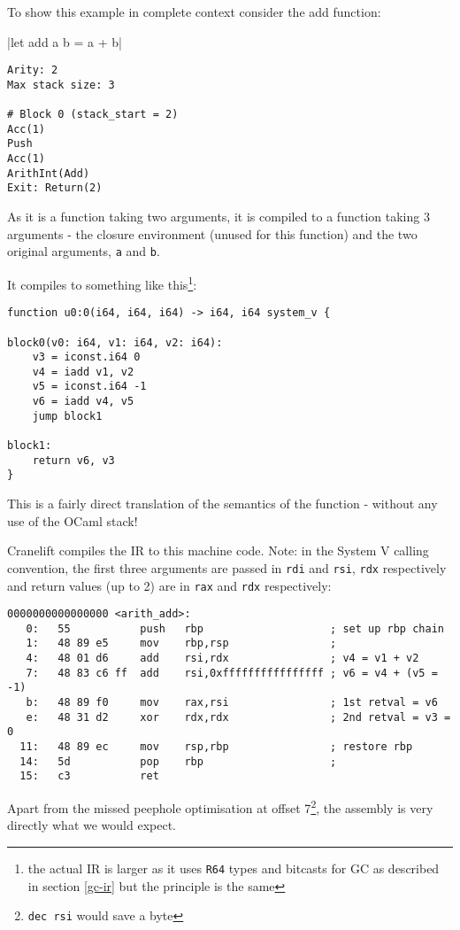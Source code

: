 To show this example in complete context consider the add function:

|let add a b = a + b|

\begin{verbatim}
Arity: 2
Max stack size: 3

# Block 0 (stack_start = 2)
Acc(1)
Push
Acc(1)
ArithInt(Add)
Exit: Return(2)
\end{verbatim}

As it is a function taking two arguments, it is compiled to a function taking 3 arguments - the
closure environment (unused for this function) and the two original arguments, \texttt{a} and
\texttt{b}.

It compiles to something like this\footnote{the actual IR is larger as it uses \texttt{R64} types
      and bitcasts for GC as
      described in section \ref{gc-ir} but the principle is the same}:

\begin{verbatim}
function u0:0(i64, i64, i64) -> i64, i64 system_v {

block0(v0: i64, v1: i64, v2: i64):
    v3 = iconst.i64 0
    v4 = iadd v1, v2
    v5 = iconst.i64 -1
    v6 = iadd v4, v5
    jump block1

block1:
    return v6, v3
}
\end{verbatim}

This is a fairly direct translation of the semantics of the function - without any use of the OCaml
stack!

Cranelift compiles the IR to this machine code. Note: in the System V calling convention, the first
three arguments are passed in \texttt{rdi} and \texttt{rsi}, \texttt{rdx} respectively and return
values (up to 2) are in \texttt{rax} and \texttt{rdx} respectively:

\begin{verbatim}
0000000000000000 <arith_add>:
   0:	55           push   rbp                    ; set up rbp chain
   1:	48 89 e5     mov    rbp,rsp                ;  
   4:	48 01 d6     add    rsi,rdx                ; v4 = v1 + v2
   7:	48 83 c6 ff  add    rsi,0xffffffffffffffff ; v6 = v4 + (v5 = -1)
   b:	48 89 f0     mov    rax,rsi                ; 1st retval = v6
   e:	48 31 d2     xor    rdx,rdx                ; 2nd retval = v3 = 0
  11:	48 89 ec     mov    rsp,rbp                ; restore rbp
  14:	5d           pop    rbp                    ;
  15:	c3           ret    
\end{verbatim}

Apart from the missed peephole optimisation at offset 7\footnote{\texttt{dec rsi} would save a
      byte}, the assembly is very directly what we would expect.

